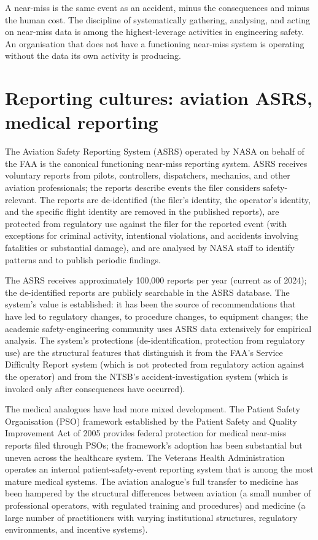 \begin{principle}
A near-miss is the same event as an accident, minus the consequences and minus the human cost. The discipline of systematically gathering, analysing, and acting on near-miss data is among the highest-leverage activities in engineering safety. An organisation that does not have a functioning near-miss system is operating without the data its own activity is producing.
\end{principle}

\section{Reporting cultures: aviation ASRS, medical reporting}

The Aviation Safety Reporting System (ASRS) operated by NASA on behalf of the FAA is the canonical functioning near-miss reporting system. ASRS receives voluntary reports from pilots, controllers, dispatchers, mechanics, and other aviation professionals; the reports describe events the filer considers safety-relevant. The reports are de-identified (the filer's identity, the operator's identity, and the specific flight identity are removed in the published reports), are protected from regulatory use against the filer for the reported event (with exceptions for criminal activity, intentional violations, and accidents involving fatalities or substantial damage), and are analysed by NASA staff to identify patterns and to publish periodic findings.

The ASRS receives approximately 100,000 reports per year (current as of 2024); the de-identified reports are publicly searchable in the ASRS database. The system's value is established: it has been the source of recommendations that have led to regulatory changes, to procedure changes, to equipment changes; the academic safety-engineering community uses ASRS data extensively for empirical analysis. The system's protections (de-identification, protection from regulatory use) are the structural features that distinguish it from the FAA's Service Difficulty Report system (which is not protected from regulatory action against the operator) and from the NTSB's accident-investigation system (which is invoked only after consequences have occurred).

The medical analogues have had more mixed development. The Patient Safety Organisation (PSO) framework established by the Patient Safety and Quality Improvement Act of 2005 provides federal protection for medical near-miss reports filed through PSOs; the framework's adoption has been substantial but uneven across the healthcare system. The Veterans Health Administration operates an internal patient-safety-event reporting system that is among the most mature medical systems. The aviation analogue's full transfer to medicine has been hampered by the structural differences between aviation (a small number of professional operators, with regulated training and procedures) and medicine (a large number of practitioners with varying institutional structures, regulatory environments, and incentive systems).

